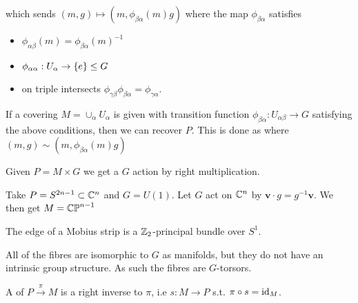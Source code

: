 \documentclass{article}
\begin{document}
\begin{comment}
\begin{tkz}
\pi^{-1}(U_{\alpha\beta}) \arrow[r,"\Psi_\beta"] \arrow[d,"\Psi_\alpha"] & U_{\alpha\beta} \times G \\
U_{\alpha\beta}\times G \arrow[ur] & 
\end{tkz}
\end{comment}
which sends $(m,g) \mapsto (m,\phi_{\beta\alpha}(m)g)$ where the map $\phi_{\beta\alpha}$ satisfies 
\begin{itemize}
    \item $\phi_{\alpha\beta}(m) = \phi_{\beta\alpha}(m)^{-1}$ 
    \item $\phi_{\alpha\alpha} : U_\alpha \to \left\{ e \right\}\leq G $
    \item on triple intersects $\phi_{\gamma\beta}\phi_{\beta\alpha} = \phi_{\gamma\alpha}$. 
\end{itemize}

\begin{remark}
If a covering $M = \cup_\alpha U_\alpha$ is given with transition function $\phi_{\beta\alpha}:U_{\alpha\beta} \to G$ satisfying the above conditions, then we can recover $P$. This is done as 
where $(m,g) \sim (m, \phi_{\beta\alpha}(m) g)$
\end{remark}

\begin{example}
Given $P=M \times G$ we get a $G$ action by right multiplication. 
\end{example}

\begin{example}
Take $P = S^{2n-1} \subset \mathbb{C}^n$ and $G = U(1)$. Let $G$ act on $\mathbb{C}^n$ by $\bm{v} \cdot g = g^{-1} \bm{v}$. We then get $M = \mathbb{CP}^{n-1}$
\end{example}

\begin{example}
The edge of a Mobius strip is a $\mathbb{Z}_2$-principal bundle over $S^1$.
\end{example}

\begin{remark}
All of the fibres are isomorphic to $G$ as manifolds, but they do not have an intrinsic group structure. As such the fibres are $G$-torsors. 
\end{remark}

\begin{definition}
A  of $P \overset{\pi}{\to}M$ is a right inverse to $\pi$, i.e $s:M \to P$ s.t. $\pi \circ s = \operatorname{id}_M$. 
\end{definition}
\end{document}

